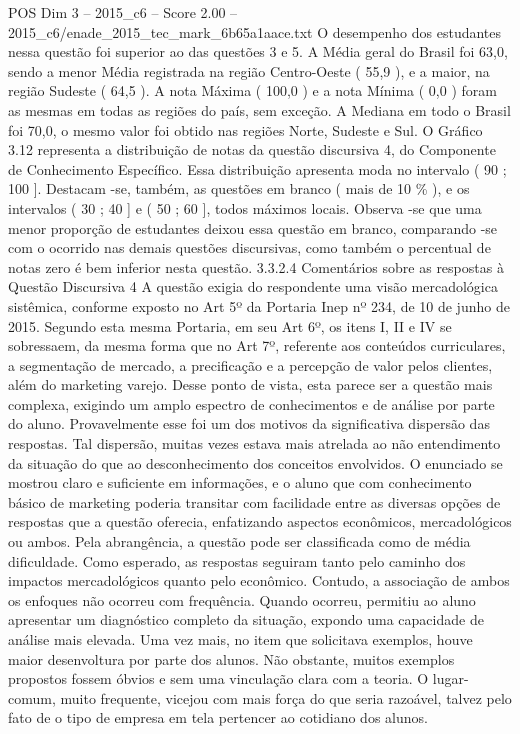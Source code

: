 \begin{textsample}{POS Dim 3 – 2015\_c6 – Score 2.00 – 2015\_c6/enade\_2015\_tec\_mark\_6b65a1aace.txt}
O desempenho dos estudantes nessa questão foi superior ao das questões 3 e 5.
A Média geral do Brasil foi 63,0, sendo a menor Média registrada na região Centro-Oeste ( 55,9 ), e a maior, na região Sudeste ( 64,5 ).
A nota Máxima ( 100,0 ) e a nota Mínima ( 0,0 ) foram as mesmas em todas as regiões do país, sem exceção.
A Mediana em todo o Brasil foi 70,0, o mesmo valor foi obtido nas regiões Norte, Sudeste e Sul.
O Gráfico 3.12 representa a distribuição de notas da questão discursiva 4, do Componente de Conhecimento Específico.
Essa distribuição apresenta moda no intervalo ( 90 ; 100 ].
Destacam -se, também, as questões em branco ( mais de 10 \% ), e os intervalos ( 30 ; 40 ] e ( 50 ; 60 ], todos máximos locais.
Observa -se que uma menor proporção de estudantes deixou essa questão em branco, comparando -se com o ocorrido nas demais questões discursivas, como também o percentual de notas zero é bem inferior nesta questão. 3.3.2.4 Comentários sobre as respostas à Questão Discursiva 4 A questão exigia do respondente uma visão mercadológica sistêmica, conforme exposto no Art 5º da Portaria Inep nº 234, de 10 de junho de 2015.
Segundo esta mesma Portaria, em seu Art 6º, os itens I, II e IV se sobressaem, da mesma forma que no Art 7º, referente aos conteúdos curriculares, a segmentação de mercado, a precificação e a percepção de valor pelos clientes, além do marketing varejo.
Desse ponto de vista, esta parece ser a questão mais complexa, exigindo um amplo espectro de conhecimentos e de análise por parte do aluno.
Provavelmente esse foi um dos motivos da significativa dispersão das respostas.
Tal dispersão, muitas vezes estava mais atrelada ao não entendimento da situação do que ao desconhecimento dos conceitos envolvidos.
O enunciado se mostrou claro e suficiente em informações, e o aluno que com conhecimento básico de marketing poderia transitar com facilidade entre as diversas opções de respostas que a questão oferecia, enfatizando aspectos econômicos, mercadológicos ou ambos.
Pela abrangência, a questão pode ser classificada como de média dificuldade.
Como esperado, as respostas seguiram tanto pelo caminho dos impactos mercadológicos quanto pelo econômico.
Contudo, a associação de ambos os enfoques não ocorreu com frequência.
Quando ocorreu, permitiu ao aluno apresentar um diagnóstico completo da situação, expondo uma capacidade de análise mais elevada.
Uma vez mais, no item que solicitava exemplos, houve maior desenvoltura por parte dos alunos.
Não obstante, muitos exemplos propostos fossem óbvios e sem uma vinculação clara com a teoria.
O lugar-comum, muito frequente, vicejou com mais força do que seria razoável, talvez pelo fato de o tipo de empresa em tela pertencer ao cotidiano dos alunos.

\end{textsample}
